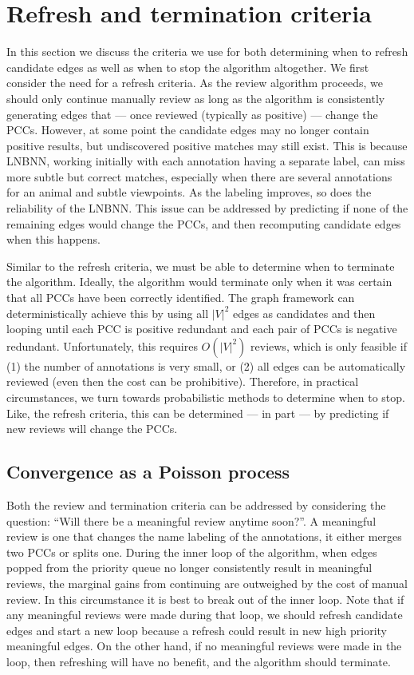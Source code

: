 \section{Refresh and termination criteria}\label{sec:converge}


In this section we discuss the criteria we use for both determining when to refresh candidate edges as well as
  when to stop the algorithm altogether.
We first consider the need for a refresh criteria.
As the review algorithm proceeds, we should only continue manually review as long as the algorithm is
  consistently generating edges that --- once reviewed (typically as positive) --- change the PCCs.
However, at some point the candidate edges may no longer contain positive results, but undiscovered positive
  matches may still exist.
This is because LNBNN, working initially with each annotation having a separate label, can miss more subtle but
  correct matches, especially when there are several annotations for an animal and subtle viewpoints.
As the labeling improves, so does the reliability of the LNBNN.
This issue can be addressed by predicting if none of the remaining edges would change the PCCs, and then
  recomputing candidate edges when this happens.

Similar to the refresh criteria, we must be able to determine when to terminate the algorithm.
Ideally, the algorithm would terminate only when it was certain that all PCCs have been correctly identified.
The graph framework can deterministically achieve this by using all $|V|^2$ edges as candidates and then looping
  until each PCC is positive redundant and each pair of PCCs is negative redundant.
Unfortunately, this requires $O(|V|^2)$ reviews, which is only feasible if
(1) the number of annotations is very small, or
(2) all edges can be automatically reviewed (even then the cost can be prohibitive).
Therefore, in practical circumstances, we turn towards probabilistic methods to determine when to stop.
Like, the refresh criteria, this can be determined --- in part --- by predicting if new reviews will change the
  PCCs.

\subsection{Convergence as a Poisson process}

Both the review and termination criteria can be addressed by considering the question:
``Will there be a meaningful review anytime soon?''.
A meaningful review is one that changes the name labeling of the annotations, \ie{} it either merges two PCCs or
  splits one.
During the inner loop of the algorithm, when edges popped from the priority queue no longer consistently result
  in meaningful reviews, the marginal gains from continuing are outweighed by the cost of manual review.
In this circumstance it is best to break out of the inner loop.
Note that if any meaningful reviews were made during that loop, we should refresh candidate edges and start a new
  loop because a refresh could result in new high priority meaningful edges.
On the other hand, if no meaningful reviews were made in the loop, then refreshing will have no benefit, and the
  algorithm should terminate.

